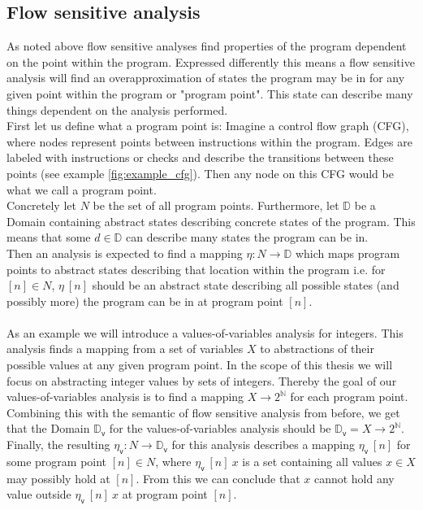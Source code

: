     \subsection{Flow sensitive analysis}

    As noted above flow sensitive analyses find properties of the program dependent on the point within the program. Expressed differently this means a flow sensitive analysis will find an overapproximation of states the program may be in for any given point within the program or "program point". This state can describe many things dependent on the analysis performed.\\
    First let us define what a program point is: Imagine a control flow graph (CFG), where nodes represent points between instructions within the program. Edges are labeled with instructions or checks and describe the transitions between these points (see example \ref{fig:example_cfg}). Then any node on this CFG would be what we call a program point.\\
    Concretely let $N$ be the set of all program points. Furthermore, let $\mathbb{D}$ be a Domain containing abstract states describing concrete states of the program. This means that some $d \in \mathbb{D}$ can describe many states the program can be in.\\ 
    Then an analysis is expected to find a mapping $\eta: N \rightarrow \mathbb{D}$ which maps program points to abstract states describing that location within the program i.e. for $[n] \in N$, $\eta\ [n]$ should be an abstract state describing all possible states (and possibly more) the program can be in at program point $[n]$.\\
    \\
    As an example we will introduce a values-of-variables analysis for integers. This analysis finds a mapping from a set of variables $X$ to abstractions of their possible values at any given program point. In the scope of this thesis we will focus on abstracting integer values by sets of integers. Thereby the goal of our values-of-variables analysis is to find a mapping $X \rightarrow 2^\mathbb{N}$ for each program point.\\
    Combining this with the semantic of flow sensitive analysis from before, we get that the Domain $\mathbb{D}_\textsf{v}$ for the values-of-variables analysis should be $\mathbb{D}_\textsf{v} = X \rightarrow 2^\mathbb{N}$. Finally, the resulting $\eta_\textsf{v}: N \rightarrow \mathbb{D}_\textsf{v}$ for this analysis describes a mapping $\eta_\textsf{v}\ [n]$ for some program point $[n] \in N$, where $\eta_\textsf{v}\ [n]\ x$ is a set containing all values $x \in X$ may possibly hold at $[n]$. From this we can conclude that $x$ cannot hold any value outside $\eta_\textsf{v}\ [n]\ x$ at program point $[n]$.

